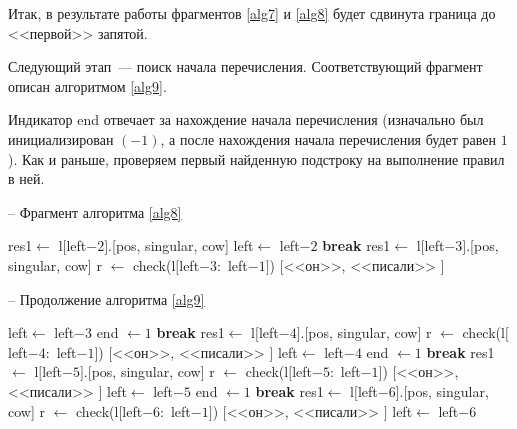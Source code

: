 \documentclass[main]{subfiles}
\begin{document}
Итак, в результате работы фрагментов \ref{alg7} и \ref{alg8} будет сдвинута граница до <<первой>> запятой.

Следующий этап~--- поиск начала перечисления. Соответствующий фрагмент описан алгоритмом \ref{alg9}.

Индикатор end отвечает за нахождение начала перечисления (изначально был инициализирован $(-1)$, а после нахождения начала перечисления будет равен $1$). Как и раньше, проверяем первый найденную подстроку на выполнение правил в ней.
\begin{algorithm}[!h]
	\caption{-- Фрагмент алгоритма \ref{alg8}}\label{alg9}
	\begin{algorithmic}[1]
	\State res1$\gets$ l$[$left$-2]$.[pos, singular, cow]
	\State left$\gets$ left$-2$
	\State \textbf{break}
	\EndIf
	\EndFor
	\EndIf
	\State res1$\gets$ l$[$left$-3]$.[pos, singular, cow]
	\State r $\gets$ check(l$[$left$-3:$ left$-1]$)
	\State \Return $[$<<он>>, <<писали>> $]$
	\end{algorithmic}
\end{algorithm}

\begin{algorithm}[!h]
	\caption{-- Продолжение алгоритма \ref{alg9}}\label{alg10}
	\begin{algorithmic}[1]
		\State left$\gets$ left$-3$
		\State end $\gets 1$
		\State \textbf{break}
			\EndIf
		\EndIf
		\EndFor
		\EndIf
		\State res1$\gets$ l$[$left$-4]$.[pos, singular, cow]
		\State r $\gets$ check(l$[$left$-4:$ left$-1]$)
		\State \Return $[$<<он>>, <<писали>> $]$
		\State left$\gets$ left$-4$
		\State end $\gets 1$
		\State \textbf{break}
		\EndIf
			\EndIf
			\EndFor
			\EndIf
			\State res1$\gets$ l$[$left$-5]$.[pos, singular, cow]
			\State r $\gets$ check(l$[$left$-5:$ left$-1]$)
			\State \Return $[$<<он>>, <<писали>> $]$
			\State left$\gets$ left$-5$
			\State end $\gets 1$
			\State \textbf{break}
			\EndIf
			\EndIf
			\EndFor
			\EndIf
			\State res1$\gets$ l$[$left$-6]$.[pos, singular, cow]
			\State r $\gets$ check(l$[$left$-6:$ left$-1]$)
			\State \Return $[$<<он>>, <<писали>> $]$
			\State left$\gets$ left$-6$
	\end{algorithmic}
\end{algorithm}
\end{document}

